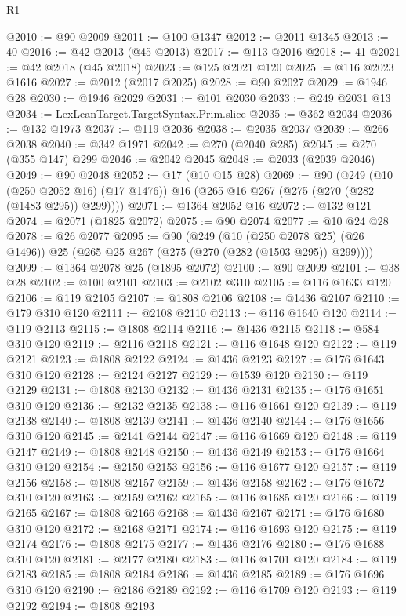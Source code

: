 \begin{lexlean}{R1}
\begin{coremodule}
@2010 := @90 @2009
@2011 := @100 @1347
@2012 := @2011 @1345
@2013 := 40
@2016 := @42 @2013 (@45 @2013)
@2017 := @113 @2016
@2018 := 41
@2021 := @42 @2018 (@45 @2018)
@2023 := @125 @2021 @120
@2025 := @116 @2023 @1616
@2027 := @2012 (@2017 @2025)
@2028 := @90 @2027
@2029 := @1946 @28
@2030 := @1946 @2029
@2031 := @101 @2030
@2033 := @249 @2031 @13
@2034 := LexLeanTarget.TargetSyntax.Prim.slice
@2035 := @362 @2034
@2036 := @132 @1973
@2037 := @119 @2036
@2038 := @2035 @2037
@2039 := @266 @2038
@2040 := @342 @1971
@2042 := @270 (@2040 @285)
@2045 := @270 (@355 @147) @299
@2046 := @2042 @2045
@2048 := @2033 (@2039 @2046)
@2049 := @90 @2048
@2052 := @17 (@10 @15 @28)
@2069 := @90
    (@249
      (@10 (@250 @2052 @16) (@17 @1476))
      @16
      (@265 @16 @267 (@275 (@270 (@282 (@1483 @295)) @299))))
@2071 := @1364 @2052 @16
@2072 := @132 @121
@2074 := @2071 (@1825 @2072)
@2075 := @90 @2074
@2077 := @10 @24 @28
@2078 := @26 @2077
@2095 := @90
    (@249
      (@10 (@250 @2078 @25) (@26 @1496))
      @25
      (@265 @25 @267 (@275 (@270 (@282 (@1503 @295)) @299))))
@2099 := @1364 @2078 @25 (@1895 @2072)
@2100 := @90 @2099
@2101 := @38 @28
@2102 := @100 @2101
@2103 := @2102 @310
@2105 := @116 @1633 @120
@2106 := @119 @2105
@2107 := @1808 @2106
@2108 := @1436 @2107
@2110 := @179 @310 @120
@2111 := @2108 @2110
@2113 := @116 @1640 @120
@2114 := @119 @2113
@2115 := @1808 @2114
@2116 := @1436 @2115
@2118 := @584 @310 @120
@2119 := @2116 @2118
@2121 := @116 @1648 @120
@2122 := @119 @2121
@2123 := @1808 @2122
@2124 := @1436 @2123
@2127 := @176 @1643 @310 @120
@2128 := @2124 @2127
@2129 := @1539 @120
@2130 := @119 @2129
@2131 := @1808 @2130
@2132 := @1436 @2131
@2135 := @176 @1651 @310 @120
@2136 := @2132 @2135
@2138 := @116 @1661 @120
@2139 := @119 @2138
@2140 := @1808 @2139
@2141 := @1436 @2140
@2144 := @176 @1656 @310 @120
@2145 := @2141 @2144
@2147 := @116 @1669 @120
@2148 := @119 @2147
@2149 := @1808 @2148
@2150 := @1436 @2149
@2153 := @176 @1664 @310 @120
@2154 := @2150 @2153
@2156 := @116 @1677 @120
@2157 := @119 @2156
@2158 := @1808 @2157
@2159 := @1436 @2158
@2162 := @176 @1672 @310 @120
@2163 := @2159 @2162
@2165 := @116 @1685 @120
@2166 := @119 @2165
@2167 := @1808 @2166
@2168 := @1436 @2167
@2171 := @176 @1680 @310 @120
@2172 := @2168 @2171
@2174 := @116 @1693 @120
@2175 := @119 @2174
@2176 := @1808 @2175
@2177 := @1436 @2176
@2180 := @176 @1688 @310 @120
@2181 := @2177 @2180
@2183 := @116 @1701 @120
@2184 := @119 @2183
@2185 := @1808 @2184
@2186 := @1436 @2185
@2189 := @176 @1696 @310 @120
@2190 := @2186 @2189
@2192 := @116 @1709 @120
@2193 := @119 @2192
@2194 := @1808 @2193

\end{coremodule}
\end{lexlean}
